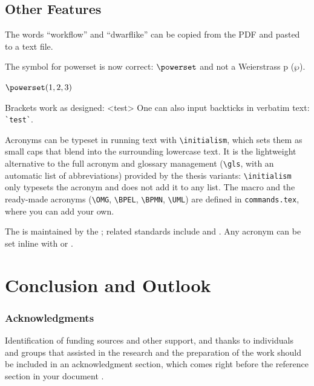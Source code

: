 \subsection{Other Features}

\begin{ltgexample}
The words \enquote{workflow} and \enquote{dwarflike} can be copied from the PDF and pasted to a text file.
\end{ltgexample}

\begin{ltgexample}
The symbol for powerset is now correct: $\powerset$ and not a Weierstrass p ($\wp$).

$\powerset({1,2,3})$
\end{ltgexample}

\begin{ltgexample}
Brackets work as designed:
<test>
One can also input backticks in verbatim text: \verb|`test`|.
\end{ltgexample}

Acronyms can be typeset in running text with \verb+\initialism+, which sets them as small caps that blend into the surrounding lowercase text. It is the lightweight alternative to the full acronym and glossary management (\verb+\gls+, with an automatic list of abbreviations) provided by the thesis variants: \verb+\initialism+ only typesets the acronym and does not add it to any list. The macro and the ready-made acronyms (\verb+\OMG+, \verb+\BPEL+, \verb+\BPMN+, \verb+\UML+) are defined in \texttt{commands.tex}, where you can add your own.

\begin{ltgexample}
The \UML is maintained by the \OMG; related standards include \BPEL and \BPMN.
Any acronym can be set inline with  or .
\end{ltgexample}


\section{Conclusion and Outlook}
\label{sec:outlook}
\lipsum[1-2]

\subsubsection*{Acknowledgments}

Identification of funding sources and other support, and thanks to individuals and groups that assisted in the research and the preparation of the work should be included in an acknowledgment section, which comes right before the reference section in your document \cite{acmart}.

